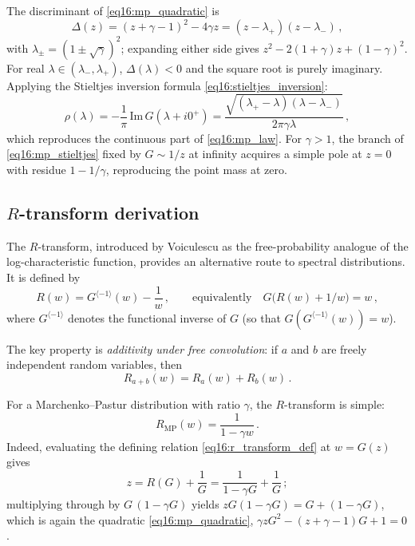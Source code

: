 \documentclass[11pt,letterpaper]{article}
\theoremstyle{plain}
\theoremstyle{definition}
\theoremstyle{remark}
\begin{document}
The discriminant of \eqref{eq16:mp_quadratic} is
\begin{equation}
  \Delta(z) = (z + \gamma - 1)^2 - 4\gamma z
  = (z - \lambda_{+})(z - \lambda_{-})\,,
  \label{eq16:discriminant}
\end{equation}
with $\lambda_{\pm} = (1 \pm \sqrt{\gamma})^2$; expanding either side gives
$z^2 - 2(1+\gamma)z + (1-\gamma)^2$.  For real
$\lambda \in (\lambda_{-}, \lambda_{+})$, $\Delta(\lambda) < 0$ and the
square root is purely imaginary.  Applying the Stieltjes inversion formula
\eqref{eq16:stieltjes_inversion}:
\begin{equation}
  \rho(\lambda) = -\frac{1}{\pi}\,\mathrm{Im}\,G(\lambda + i0^{+})
  = \frac{\sqrt{(\lambda_{+} - \lambda)(\lambda - \lambda_{-})}}
  {2\pi\gamma\lambda}\,,
  \label{eq16:mp_density_derived}
\end{equation}
which reproduces the continuous part of \eqref{eq16:mp_law}.  For
$\gamma > 1$, the branch of \eqref{eq16:mp_stieltjes} fixed by $G \sim 1/z$
at infinity acquires a simple pole at $z = 0$ with residue $1 - 1/\gamma$,
reproducing the point mass at zero.

\subsection{\texorpdfstring{$R$}{R}-transform derivation}

The $R$-transform, introduced by Voiculescu \cite{voiculescu1991} as the
free-probability analogue of the log-characteristic function, provides an
alternative route to spectral distributions.  It is defined by
\begin{equation}
  R(w) = G^{\langle -1\rangle}(w) - \frac{1}{w}\,,
  \qquad \text{equivalently}\quad
  G\bigl(R(w) + 1/w\bigr) = w\,,
  \label{eq16:r_transform_def}
\end{equation}
where $G^{\langle -1\rangle}$ denotes the functional inverse of $G$ (so that
$G(G^{\langle -1\rangle}(w)) = w$).

The key property is \emph{additivity under free convolution}: if $a$ and $b$
are freely independent random variables, then
\begin{equation}
  R_{a+b}(w) = R_a(w) + R_b(w)\,.
  \label{eq16:r_additivity}
\end{equation}

For a Marchenko--Pastur distribution with ratio $\gamma$, the $R$-transform is
simple:
\begin{equation}
  R_{\mathrm{MP}}(w) = \frac{1}{1 - \gamma w}\,.
  \label{eq16:r_mp}
\end{equation}
Indeed, evaluating the defining relation \eqref{eq16:r_transform_def} at
$w = G(z)$ gives
\begin{equation}
  z = R(G) + \frac{1}{G} = \frac{1}{1 - \gamma G} + \frac{1}{G}\,;
  \label{eq16:r_mp_check}
\end{equation}
multiplying through by $G\,(1 - \gamma G)$ yields
$z G (1 - \gamma G) = G + (1 - \gamma G)$, which is again the quadratic
\eqref{eq16:mp_quadratic}, $\gamma z G^2 - (z + \gamma - 1)G + 1 = 0$.
\end{document}
